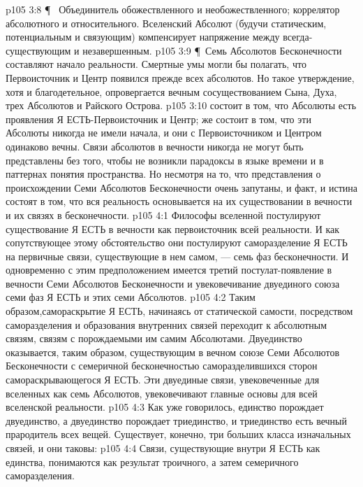 \vs p105 3:8 \P\ \bibnobreakspace {} Объединитель обожествленного и необожествленного; коррелятор абсолютного и относительного. Вселенский Абсолют (будучи статическим, потенциальным и связующим) компенсирует напряжение между всегда\hyp{}существующим и незавершенным.
\vs p105 3:9 \P\ Семь Абсолютов Бесконечности составляют начало реальности. Смертные умы могли бы полагать, что Первоисточник и Центр появился прежде всех абсолютов. Но такое утверждение, хотя и благодетельное, опровергается вечным сосуществованием Сына, Духа, трех Абсолютов и Райского Острова.
\vs p105 3:10  состоит в том, что Абсолюты есть проявления Я ЕСТЬ\hyp{}Первоисточник и Центр;  же состоит в том, что эти Абсолюты никогда не имели начала, и они с Первоисточником и Центром одинаково вечны. Связи абсолютов в вечности никогда не могут быть представлены без того, чтобы не возникли парадоксы в языке времени и в паттернах понятия пространства. Но несмотря на то, что представления о происхождении Семи Абсолютов Бесконечности очень запутаны, и факт, и истина состоят в том, что вся реальность основывается на их существовании в вечности и их связях в бесконечности.
\vs p105 4:1 Философы вселенной постулируют существование Я ЕСТЬ в вечности как первоисточник всей реальности. И как сопутствующее этому обстоятельство они постулируют саморазделение Я ЕСТЬ на первичные связи, существующие в нем самом, --- семь фаз бесконечности. И одновременно с этим предположением имеется третий постулат\hyp{}появление в вечности Семи Абсолютов Бесконечности и увековечивание двуединого союза семи фаз Я ЕСТЬ и этих семи Абсолютов.
\vs p105 4:2 Таким образом,самораскрытие Я ЕСТЬ, начинаясь от статической самости, посредством саморазделения и образования внутренних связей переходит к абсолютным связям, связям с порождаемыми им самим Абсолютами. Двуединство оказывается, таким образом, существующим в вечном союзе Семи Абсолютов Бесконечности с семеричной бесконечностью саморазделившихся сторон самораскрывающегося Я ЕСТЬ. Эти двуединые связи, увековеченные для вселенных как семь Абсолютов, увековечивают главные основы для всей вселенской реальности.
\vs p105 4:3 Как уже говорилось, единство порождает двуединство, а двуединство порождает триединство, и триединство есть вечный прародитель всех вещей. Существует, конечно, три больших класса изначальных связей, и они таковы:
\vs p105 4:4 \bibnobreakspace {} Связи, существующие внутри Я ЕСТЬ как единства, понимаются как результат троичного, а затем семеричного саморазделения.
